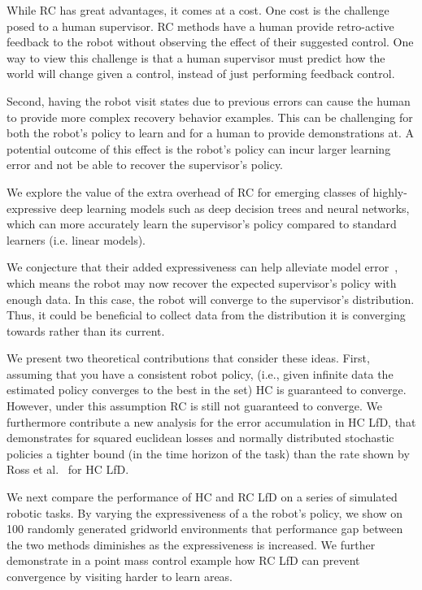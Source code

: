 \documentclass[10pt, conference]{ieeeconf}      %
\begin{document}
While RC has great advantages, it comes at a cost. One cost is the challenge posed to a human supervisor.  RC methods have a human provide retro-active feedback to the robot without observing the effect of their suggested control.  One way to view this challenge is that a human supervisor must  predict how the world will change given a control, instead of just performing feedback control. 

 Second, having the robot visit states due to previous errors can cause the human to provide more complex recovery behavior examples. This can be challenging for both the robot's policy to learn and for a human to provide demonstrations at. A potential outcome of this effect is the robot's policy can incur larger learning error and not be able to recover the supervisor's policy. 
 
We explore the value of the extra overhead of RC for emerging classes of highly-expressive deep learning models such as deep decision trees and neural networks, which can more accurately learn the supervisor's policy compared to standard learners (i.e. linear models). 

We  conjecture that their added expressiveness can help alleviate model error~\cite{vapnik1992principles}, which means the robot may now recover the expected supervisor's policy with  enough data. In this case, the robot will converge to the  supervisor's distribution. Thus,  it could be beneficial to collect data from the distribution it is converging towards rather than its current. 

We present two theoretical contributions that consider these ideas. First, assuming that you have a consistent robot policy, (i.e., given infinite data the estimated policy converges to the best in the set) HC is guaranteed to converge. However, under this assumption RC is still not guaranteed to converge. We furthermore contribute a new analysis for the error accumulation in HC LfD, that demonstrates for squared euclidean losses and normally distributed stochastic policies a tighter bound (in the time horizon of the task) than the rate shown by Ross et al.~\cite{ross2010efficient} for HC LfD.

We next compare the performance of HC and RC LfD on a series of simulated robotic tasks. By varying the expressiveness of a the robot's policy, we show on 100 randomly generated gridworld environments that performance gap between the two methods diminishes as the expressiveness is increased. We further demonstrate in a point mass control example how RC LfD can prevent convergence by visiting harder to learn areas. 
\end{document}
